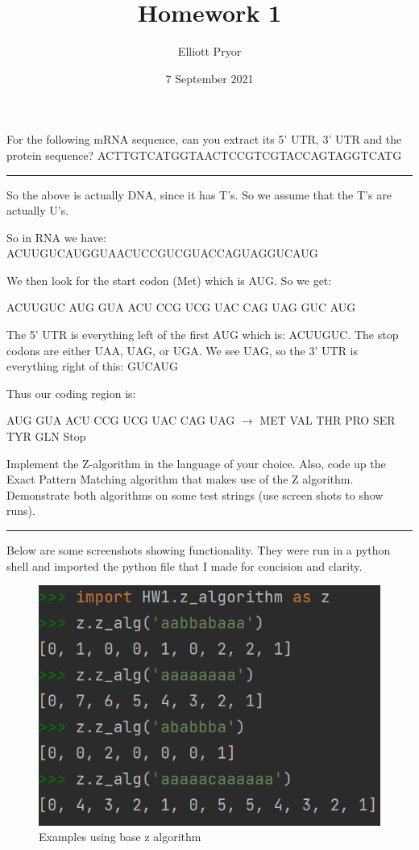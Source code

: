 \documentclass[11pt]{article}
\title{Homework 1}
\author{Elliott Pryor}
\date{7 September 2021}
\begin{document}
\maketitle


For the following mRNA sequence, can you extract its 5’ UTR, 3’ UTR
and the protein sequence?
ACTTGTCATGGTAACTCCGTCGTACCAGTAGGTCATG

\hrule

So the above is actually DNA, since it has T's. So we assume that the T's are actually U's.

So in RNA we have: ACUUGUCAUGGUAACUCCGUCGUACCAGUAGGUCAUG

We then look for the start codon (Met) which is AUG. So we get:

ACUUGUC AUG GUA ACU CCG UCG UAC CAG UAG GUC AUG

The 5' UTR is everything left of the first AUG which is: ACUUGUC.
The stop codons are either UAA, UAG, or UGA. 
We see UAG, so the 3' UTR is everything right of this: GUCAUG

Thus our coding region is:

AUG GUA ACU CCG UCG UAC CAG UAG $\rightarrow$ MET VAL THR PRO SER TYR GLN Stop


Implement the Z-algorithm in the language of your choice.  Also, code up the Exact Pattern Matching algorithm that makes use of the Z algorithm.
Demonstrate both algorithms on some test strings (use screen shots to show runs).
\hrule

Below are some screenshots showing functionality. 
They were run in a python shell and imported the python file that I made for concision and clarity.


\begin{figure}[h]
    \centering
    \includegraphics[]{example1.png}
    \caption{Examples using base z algorithm}
    \label{fig:z_alg}
\end{figure}
\end{document}
